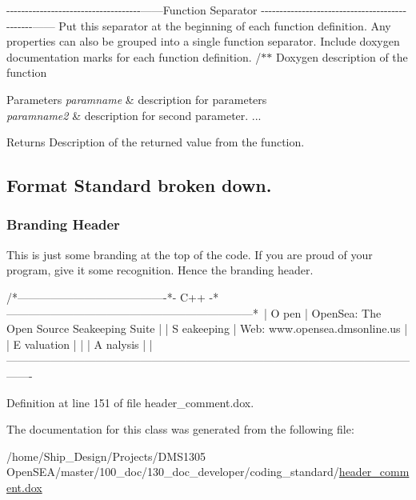 -\/-\/-\/-\/-\/-\/-\/-\/-\/-\/-\/-\/-\/-\/-\/-\/-\/-\/-\/-\/-\/-\/-\/-\/-\/-\/-\/-\/-\/-\/-\/-\/-\/-\/-\/-\/------Function Separator -\/-\/-\/-\/-\/-\/-\/-\/-\/-\/-\/-\/-\/-\/-\/-\/-\/-\/-\/-\/-\/-\/-\/-\/-\/-\/-\/-\/-\/-\/-\/-\/-\/-\/-\/-\/-\/-\/-\/-\/-\/-\/-\/-\/-\/-\/------ Put this separator at the beginning of each function definition. Any properties can also be grouped into a single function separator. Include doxygen documentation marks for each function definition. /$\ast$$\ast$ Doxygen description of the function 
\begin{DoxyParams}{Parameters}
{\em paramname} & description for parameters \\
\hline
{\em paramname2} & description for second parameter. ... \\
\hline
\end{DoxyParams}
\begin{DoxyReturn}{Returns}
Description of the returned value from the function.
\end{DoxyReturn}
\hypertarget{class_test_doxydown}{}\subsection{Format Standard broken down.}\label{class_test_doxydown}
\hypertarget{class_test_brandheader}{}\subsubsection{Branding Header}\label{class_test_brandheader}
This is just some branding at the top of the code. If you are proud of your program, give it some recognition. Hence the branding header.

\begin{DoxyVerb}  /*----------------------------------------*- C++ -*------------------------------------------------------------------*\
  | O pen         | OpenSea: The Open Source Seakeeping Suite                                                           |
  | S eakeeping   | Web:     www.opensea.dmsonline.us                                                                   |
  | E valuation   |                                                                                                     |
  | A nalysis     |                                                                                                     |
  \*------------------------------------------------------------------------------------------------------------------- \end{DoxyVerb}
 

Definition at line 151 of file header\-\_\-comment.\-dox.



The documentation for this class was generated from the following file\-:\begin{DoxyCompactItemize}
\item 
/home/\-Ship\-\_\-\-Design/\-Projects/\-D\-M\-S1305 Open\-S\-E\-A/master/100\-\_\-doc/130\-\_\-doc\-\_\-developer/coding\-\_\-standard/\hyperlink{header__comment_8dox}{header\-\_\-comment.\-dox}\end{DoxyCompactItemize}
